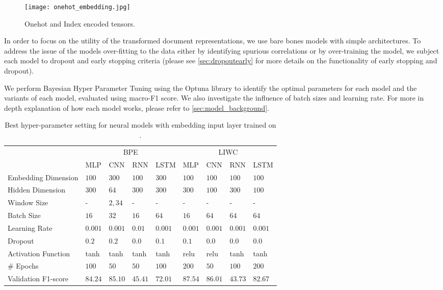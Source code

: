 \begin{figure}
  \centering
  \texttt{[image: onehot\_embedding.jpg]}
  \caption{Onehot and Index encoded tensors.}
  \label{fig:onehot_embedding}
\end{figure}

In order to focus on the utility of the transformed document representations, we use bare bones models with simple architectures. To address the issue of the models over-fitting to the data either by identifying spurious correlations or by over-training the model, we subject each model to dropout and early stopping criteria (please see \autoref{sec:dropoutearly} for more details on the functionality of early stopping and dropout).

We perform Bayesian Hyper Parameter Tuning using the Optuna library \cite{Optuna:2019} to identify the optimal parameters for each model and the variants of each model, evaluated using macro-F1 score. We also investigate the influence of batch sizes and learning rate. For more in depth explanation of how each model works, please refer to \autoref{sec:model_background}.\vspace{5mm}

\begin{landscape}
\begin{table}[]
\centering
\begin{tabular}{lllllllll}
                      & \multicolumn{4}{c}{BPE}                 & \multicolumn{4}{c|}{LIWC} \\
                       & MLP     & CNN      & RNN     & LSTM    & MLP     & CNN     & RNN     & LSTM     \\ \hline
Embedding Dimension    & $100$   & $300$    & $100$   & $300$   & $100$   & $100$   & $100$   & $100$    \\
Hidden Dimension       & $300$   & $64$     & $300$   & $300$   & $300$   & $100$   & $300$   & $100$    \\
Window Size            & -       & $2, 3 4$ & -       & -       & -       & -       & -       & -        \\
Batch Size             & $16$    & $32$     & $16$    & $64$    & $16$    & $64$    & $64$    & $64$     \\
Learning Rate          & $0.001$ & $0.001$  & $0.01$  & $0.001$ & $0.001$ & $0.001$ & $0.001$ & $0.001$  \\
Dropout                & $0.2$   & $0.2$    & $0.0$   & $0.1$   & $0.1$   & $0.0$   & $0.0$   & $0.0$    \\
Activation Function    & tanh    & tanh     & tanh    & tanh    & relu    & relu    & tanh    & tanh     \\
# Epochs               & $100$   & $50$     & $50$    & $100$   & $200$   & $50$    & $100$   & $200$    \\
Validation F1-score    & $84.24$ & $85.10$  & $45.41$ & $72.01$ & $87.54$ & $86.01$ & $43.73$ & $82.67$  
\end{tabular}
\caption{Best hyper-parameter setting for neural models with embedding input layer trained on \citet{Davidson:2017}.}
\label{tab:redux_hyperparam_search_davidson}
\end{table}
\end{landscape}


